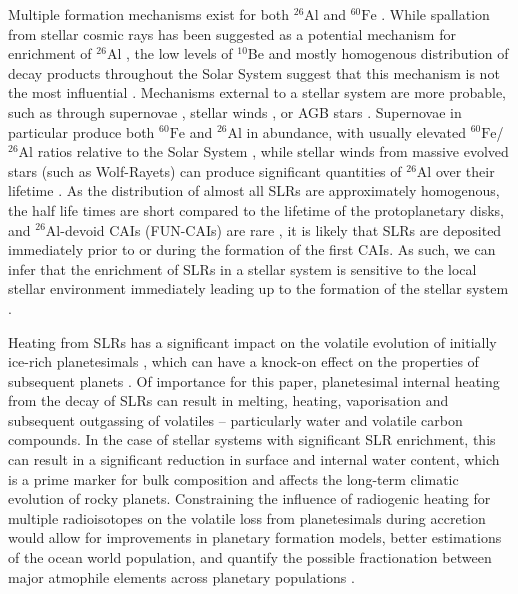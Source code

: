 \documentclass[fleqn,usenatbib]{mnras}
\newcommand{\atom}[2]{$^{#2}\text{#1}$}
\newcommand{\al}{\atom{Al}{26}}
\newcommand{\fe}{\atom{Fe}{60}}
\begin{document}
Multiple formation mechanisms exist for both \al{} and \fe{} \citep{2018PrPNP.102....1L,2021PASA...38...62D,2023JPhG...50c3002L}.
While spallation from stellar cosmic rays has been suggested as a potential mechanism for enrichment of \al{} \citep{2021ApJ...919...10A}, the low levels of $^{10}$Be \citep{2000Sci...289.1334M,2022GeCoA.324..194D} and mostly homogenous distribution of decay products throughout the Solar System \citep{2022arXiv220311169D} suggest that this mechanism is not the most influential \citep{parkerBirthEnvironmentPlanetary2020}. 
Mechanisms external to a stellar system are more probable, such as through supernovae \citep{chevalierYoungCircumstellarDisks2000,2010ARA&A..48...47A,2010ApJ...711..597O,2014MNRAS.437..946P,2015PhyS...90f8001P}, stellar winds \citep{2009ApJ...696.1854G}, or AGB stars \citep{2018PrPNP.102....1L}.
Supernovae in particular produce both \fe{} and \al{} in abundance, with usually elevated \fe{}/\al{} ratios relative to the Solar System \citep{2016ApJ...826...22K,lichtenbergIsotopicEnrichmentForming2016}, while stellar winds from massive evolved stars (such as Wolf-Rayets) can produce significant quantities of \al{} over their lifetime \citep{limongiNucleosynthesis26Al60Fe2006,limongiPresupernovaEvolutionExplosive2018}.
As the distribution of almost all SLRs are approximately homogenous, the half life times are short compared to the lifetime of the protoplanetary disks, and \al{}-devoid CAIs (FUN-CAIs) are rare \citep{villeneuveHomogeneousDistribution26Al2009,2023Icar..40215611D}, it is likely that SLRs are deposited immediately prior to or during the formation of the first CAIs.
As such, we can infer that the enrichment of SLRs in a stellar system is sensitive to the local stellar environment immediately leading up to the formation of the stellar system \citep{2010ARA&A..48...47A,2019A&A...622A..69P,parkerBirthEnvironmentPlanetary2020}.

Heating from SLRs has a significant impact on the volatile evolution of initially ice-rich planetesimals \citep{2017pedc.book...92C,2021Icar..36314437G,2023Natur.615..854N}, which can have a knock-on effect on the properties of subsequent planets \citep{grimmHeliocentricZoningAsteroid1993,2021Sci...371..365L}.
Of importance for this paper, planetesimal internal heating from the decay of SLRs can result in melting, heating, vaporisation and subsequent outgassing of volatiles -- particularly water and volatile carbon compounds.
In the case of stellar systems with significant SLR enrichment, this can result in a significant reduction in surface and internal water content, which is a prime marker for bulk composition and affects the long-term climatic evolution of rocky planets. Constraining the influence of radiogenic heating for multiple radioisotopes on the volatile loss from planetesimals during accretion would allow for improvements in planetary formation models, better estimations of the ocean world population, and quantify the possible fractionation between major atmophile elements across planetary populations \citep{2019MNRAS.482.2222W,2023ApJ...948...53S}.
\end{document}
